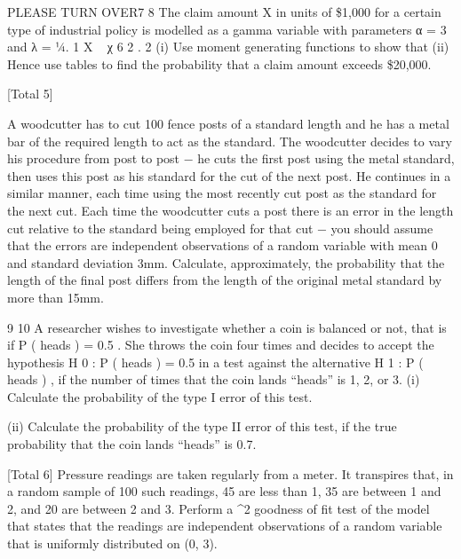 \documentclass[a4paper,12pt]{article}
\begin{document}
\begin{enumerate}
PLEASE TURN OVER7
8
The claim amount X in units of \$1,000 for a certain type of industrial policy is
modelled as a gamma variable with parameters α = 3 and λ = 1⁄4.
1
X ~ χ 6 2 .
2
(i) Use moment generating functions to show that
(ii) Hence use tables to find the probability that a claim amount exceeds \$20,000.

[Total 5]

A woodcutter has to cut 100 fence posts of a standard length and he has a metal bar of
the required length to act as the standard. The woodcutter decides to vary his
procedure from post to post − he cuts the first post using the metal standard, then uses
this post as his standard for the cut of the next post. He continues in a similar manner,
each time using the most recently cut post as the standard for the next cut.
Each time the woodcutter cuts a post there is an error in the length cut relative to the
standard being employed for that cut − you should assume that the errors are
independent observations of a random variable with mean 0 and standard deviation
3mm.
Calculate, approximately, the probability that the length of the final post differs from
the length of the original metal standard by more than 15mm.

9
10
A researcher wishes to investigate whether a coin is balanced or not, that is if
P ( heads ) = 0.5 . She throws the coin four times and decides to accept the hypothesis
H 0 : P ( heads ) = 0.5 in a test against the alternative H 1 : P ( heads )  , if the number
of times that the coin lands “heads” is 1, 2, or 3.
(i) Calculate the probability of the type I error of this test.

(ii) Calculate the probability of the type II error of this test, if the true probability
that the coin lands “heads” is 0.7.

[Total 6]
Pressure readings are taken regularly from a meter. It transpires that, in a random
sample of 100 such readings, 45 are less than 1, 35 are between 1 and 2, and 20 are
between 2 and 3.
Perform a \chi^2 goodness of fit test of the model that states that the readings are
independent observations of a random variable that is uniformly distributed on (0, 3).


\end{enumerate}
\end{document}
